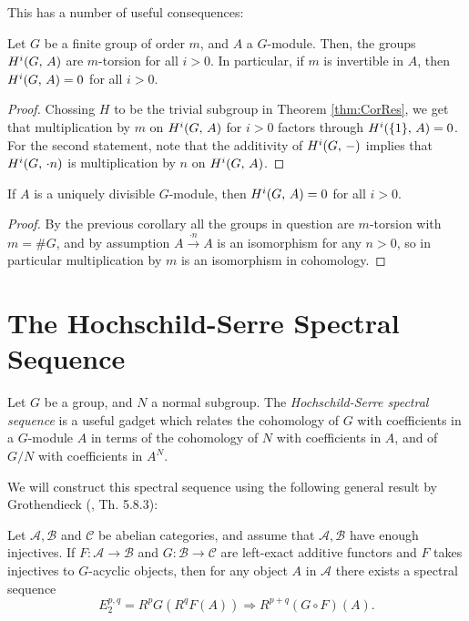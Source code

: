 \documentclass[a4paper, oneside]{memoir}
\begin{document}
This has a number of useful consequences:
\begin{corollary}
	Let $G$ be a finite group of order $m$, and $A$ a $G$-module. Then, the groups $H^{i}( G, \, A )$ are $m$-torsion for all $i>0$. In particular, if $m$ is invertible in $A$, then $H^{i}( G, \, A )=0$ for all $i>0$.
\end{corollary}
\begin{proof}
	Chossing $H$ to be the trivial subgroup in Theorem \ref{thm:CorRes}, we get that multiplication by $m$ on $H^{i}( G, \, A )$ for $i>0$ factors through $H^{i}( \{1\}, \, A )=0$. For the second statement, note that the additivity of $H^{i}( G, \, - )$ implies that $H^{i}( G, \, \cdot n )$ is multiplication by $n$ on $H^{i}( G, \, A )$.
\end{proof}

\begin{corollary}\label{cor:UniqDiv}
	If $A$ is a uniquely divisible $G$-module, then $H^{i}( G, \, A )=0$ for all $i>0$.
\end{corollary}
\begin{proof}
	By the previous corollary all the groups in question are $m$-torsion with $m=\#G$, and by assumption $A\overset{\cdot n}{\to} A$ is an isomorphism for any $n>0$, so in particular multiplication by $m$ is an isomorphism in cohomology.
\end{proof}

\section{The Hochschild-Serre Spectral Sequence}

Let $G$ be a group, and $N$ a normal subgroup. The \textit{Hochschild-Serre spectral sequence} is a useful gadget which relates the cohomology of $G$ with coefficients in a $G$-module $A$ in terms of the cohomology of $N$ with coefficients in $A$, and of $G / N$ with coefficients in $A^N$.

We will construct this spectral sequence using the following general result by Grothendieck (\cite{Weibel}, Th. 5.8.3):
\begin{theorem}
	Let $\mathcal{A}, \mathcal{B}$ and $\mathcal{C}$ be abelian categories, and assume that $\mathcal{A}, \mathcal{B}$ have enough injectives. If $F: \mathcal{A}\to \mathcal{B}$ and $G: \mathcal{B}\to \mathcal{C}$ are left-exact additive functors and $F$ takes injectives to $G$-acyclic objects, then for any object $A$ in $\mathcal{A}$ there exists a spectral sequence
	\[
		E_2^{p,q} = R^pG(R^qF(A)) \Longrightarrow R^{p+q}(G\circ F)(A).
	\]
\end{theorem}
\end{document}
